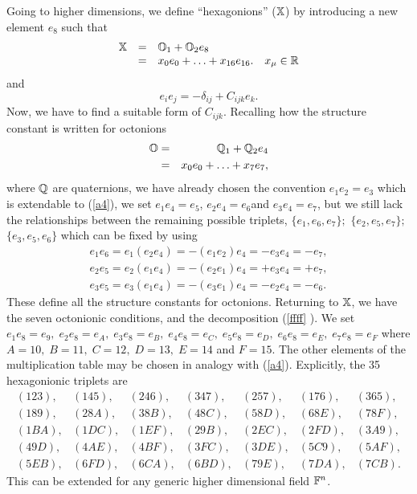 \documentclass[a4paper,12pt]{book}
\begin{document}
Going to higher dimensions, we define ``hexagonions'' ($\Bbb{X}$) by
introducing a new element $e_{8}$ such that 
\begin{equation}
\begin{array}{llll}
\Bbb{X} & = & \Bbb{O}_{1}+\Bbb{O}_{2}e_{8} &  \\ 
& = & x_{0}e_{0}+\ldots +x_{16}e_{16}. & x_{\mu }\in \Bbb{R}
\end{array}
\label{ffff}
\end{equation}
and 
\begin{equation}
e_{i}e_{j}=-\delta _{ij}+C_{ijk}e_{k}.
\end{equation}
Now, we have to find a suitable form of $C_{ijk}$. Recalling how the
structure constant is written for octonions 
\begin{eqnarray}
\Bbb{O} &=&\Bbb{Q}_{1}+\Bbb{Q}_{2}e_{4}  \nonumber \\
&=&x_{0}e_{0}+\ldots +x_{7}e_{7},  \label{a4}
\end{eqnarray}
where $\Bbb{Q}$ are quaternions, we have already chosen the convention $%
e_{1}e_{2}=e_{3}$ which is extendable to (\ref{a4}), we set $%
e_{1}e_{4}=e_{5} $, $e_{2}e_{4}=e_{6}$and $e_{3}e_{4}=e_{7}$, but we still
lack the relationships between the remaining possible triplets, $%
\{e_{1},e_{6},e_{7}\};$ $\{e_{2},e_{5},e_{7}\};$ $\{e_{3},e_{5},e_{6}\}$
which can be fixed by using 
\[
\begin{array}{c}
e_{1}e_{6}=e_{1}(e_{2}e_{4})=-(e_{1}e_{2})e_{4}=-e_{3}e_{4}=-e_{7}, \\ 
e_{2}e_{5}=e_{2}(e_{1}e_{4})=-(e_{2}e_{1})e_{4}=+e_{3}e_{4}=+e_{7}, \\ 
e_{3}e_{5}=e_{3}(e_{1}e_{4})=-(e_{3}e_{1})e_{4}=-e_{2}e_{4}=-e_{6}.
\end{array}
\]
These define all the structure constants for octonions. Returning to $\Bbb{X}
$, we have the seven octonionic conditions, and the decomposition (\ref{ffff}%
). We set $e_{1}e_{8}=e_{9},\;e_{2}e_{8}=e_{A},\;e_{3}e_{8}=e_{B},%
\;e_{4}e_{8}=e_{C},\;e_{5}e_{8}=e_{D},\;e_{6}e_{8}=e_{E},\;e_{7}e_{8}=e_{F}$
where $A=10,\;B=11,\;C=12,\;D=13,\;E=14$ and $F=15$. The other elements of
the multiplication table may be chosen in analogy with (\ref{a4}).
Explicitly, the 35 hexagonionic triplets are 
\[
\begin{array}{ccccccc}
(123), & (145), & (246), & (347), & (257), & (176), & (365), \\ 
(189), & (28A), & (38B), & (48C), & (58D), & (68E), & (78F), \\ 
(1BA), & (1DC), & (1EF), & (29B), & (2EC), & (2FD), & (3A9), \\ 
(49D), & (4AE), & (4BF), & (3FC), & (3DE), & (5C9), & (5AF), \\ 
(5EB), & (6FD), & (6CA), & (6BD), & (79E), & (7DA), & (7CB).
\end{array}
\]
This can be extended for any generic higher dimensional field $\Bbb{F}^{n}$.
\end{document}
